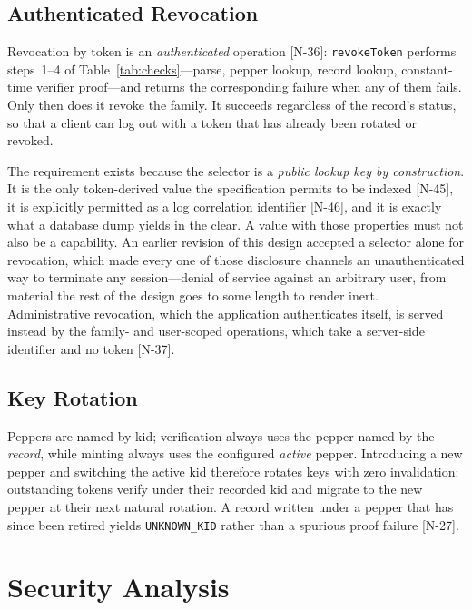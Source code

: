 \documentclass[11pt]{article}
\begin{document}
\subsection{Authenticated Revocation}
\label{sec:revoke}

Revocation by token is an \emph{authenticated} operation [N-36]:
\texttt{revokeToken} performs steps~1--4 of Table~\ref{tab:checks}---parse,
pepper lookup, record lookup, constant-time verifier proof---and returns the
corresponding failure when any of them fails. Only then does it revoke the
family. It succeeds regardless of the record's status, so that a client can
log out with a token that has already been rotated or revoked.

The requirement exists because the selector is a \emph{public lookup key by
construction}. It is the only token-derived value the specification permits
to be indexed [N-45], it is explicitly permitted as a log correlation
identifier [N-46], and it is exactly what a database dump yields in the
clear. A value with those properties must not also be a capability. An
earlier revision of this design accepted a selector alone for revocation,
which made every one of those disclosure channels an unauthenticated way to
terminate any session---denial of service against an arbitrary user, from
material the rest of the design goes to some length to render inert.
Administrative revocation, which the application authenticates itself, is
served instead by the family- and user-scoped operations, which take a
server-side identifier and no token [N-37].

\subsection{Key Rotation}

Peppers are named by kid; verification always uses the pepper named by the
\emph{record}, while minting always uses the configured \emph{active}
pepper. Introducing a new pepper and switching the active kid therefore
rotates keys with zero invalidation: outstanding tokens verify under their
recorded kid and migrate to the new pepper at their next natural rotation.
A record written under a pepper that has since been retired yields
\texttt{UNKNOWN\_KID} rather than a spurious proof failure [N-27].

\section{Security Analysis}
\label{sec:security}
\end{document}
